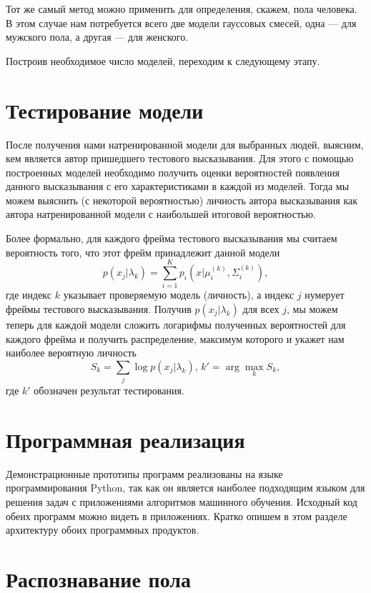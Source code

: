 \documentclass[12pt]{gost-7-32}
\begin{document}
Тот же самый метод можно применить для определения, скажем, пола человека.
В этом случае нам потребуется всего две модели гауссовых смесей, одна --- для мужского пола, а другая --- для женского.

Построив необходимое число моделей, переходим к следующему этапу.

\newpage
\section{Тестирование модели}

После получения нами натренированной модели для выбранных людей, выясним, кем является автор пришедшего тестового высказывания.
Для этого с помощью построенных моделей необходимо получить оценки вероятностей появления данного высказывания с его характеристиками в каждой из моделей.
Тогда мы можем выяснить (с некоторой вероятностью) личность автора высказывания как автора натренированной модели с наибольшей итоговой вероятностью.

Более формально, для каждого фрейма тестового высказывания мы считаем вероятность того, что этот фрейм принадлежит данной модели
\begin{equation}
    p(x_j | \lambda_k) = \sum_{i = 1}^K p_i(x | \mu_i^{(k)}, \Sigma_i^{(k)}),
\end{equation}
где индекс $k$ указывает проверяемую модель (личность), а индекс $j$ нумерует фреймы тестового высказывания.
Получив $p(x_j | \lambda_k)$ для всех $j$, мы можем теперь для каждой модели сложить логарифмы полученных вероятностей для каждого фрейма и получить распределение, максимум которого и укажет нам наиболее вероятную личность
\begin{equation}
    S_k = \sum_j \log p(x_j | \lambda_k) \text{, } k' = \arg \max_k S_k,
\end{equation}
где $k'$ обозначен результат тестирования.

\section{Программная реализация}

Демонстрационные прототипы программ реализованы на языке программирования Python, так как он является наиболее подходящим языком для решения задач с приложениями алгоритмов машинного обучения.
Исходный код обеих программ можно видеть в приложениях.
Кратко опишем в этом разделе архитектуру обоих программных продуктов.

\newpage
\section{Распознавание пола}
\end{document}
